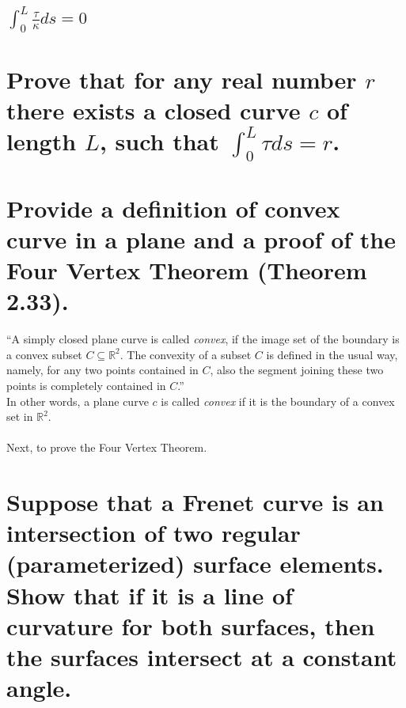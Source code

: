 \documentclass[12pt]{amsart}
\begin{document}
\subsection{$\int_0^L\frac{\tau}{\kappa}ds=0$}

\newpage
\section{Prove that for any real number $r$ there exists a closed curve $c$ of length $L$, such that $\int_0^L\tau ds=r$.}

\newpage
\section{Provide a definition of convex curve in a plane and a proof of the Four Vertex Theorem (Theorem 2.33).}
``A simply closed plane curve is called \textit{convex}, if the image set of the boundary is a convex subset $C\subseteq\mathbb{R}^2$. The convexity of a subset $C$ is defined in the usual way, namely, for any two points contained in $C$, also the segment joining these two points is completely contained in $C$.''
\\In other words, a plane curve $c$ is called \textit{convex} if it is the boundary of a convex set in $\mathbb{R}^2$.
\\
\\Next, to prove the Four Vertex Theorem.
\\

\newpage
\section{Suppose that a Frenet curve is an intersection of two regular (parameterized) surface elements. Show that if it is a line of curvature for both surfaces, then the surfaces intersect at a constant angle.}
\end{document}
